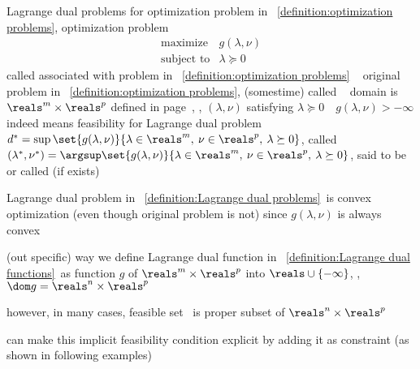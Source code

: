 \documentclass[17pt,landscape]{foils}
\begin{document}
{\begin{mydefinition}{Lagrange dual problems}
	for optimization problem in ~\ref{definition:optimization problems},
	optimization problem
	$$
		\begin{array}{ll}
			\mbox{maximize} &
				g(\lambda,\nu)
			\\
			\mbox{subject to} &
				\lambda \succeq 0
		\end{array}
	$$
	called 
	associated with problem in ~\ref{definition:optimization problems}
	\shrinkspacewithintheoremslike\
	\ibit
	\iitem
		original problem in ~\ref{definition:optimization problems},
		(somestime) called \define{primal problem}\
	\iitem
		domain is $\reals^m\times \reals^p$
	\iitem
		 defined in page~\pageref{page:dual feasible},
		\ie, $(\lambda,\nu)$ satisfying
		$
			\lambda \succeq 0 \quad g(\lambda,\nu) > -\infty
		$
		indeed means
		feasibility for Lagrange dual problem
	\iitem
		$d^\ast = \sup\set{g(\lambda,\nu)}{\lambda\in\reals^m,\:\nu\in\reals^p,\:\lambda\succeq 0}$,
		called 
	\iitem
		$(\lambda^\ast,\nu^\ast) = \argsup\set{g(\lambda,\nu)}{\lambda\in\reals^m,\:\nu\in\reals^p,\:\lambda\succeq 0}$,
		said to be  or called  (if exists)
	\eit
\end{mydefinition}
%

\bit
\item
	Lagrange dual problem in ~\ref{definition:Lagrange dual problems}\
	is convex optimization (even though original problem is not)
	since $g(\lambda,\nu)$ is always convex
\eit
\vfill



\bit
\item
	(out specific) way we define Lagrange dual function in ~\ref{definition:Lagrange dual functions}\
	as function $g$ of $\reals^m \times \reals^p$ into $\reals\cup\{-\infty\}$,
	\ie,
	$\dom g = \reals^n\times\reals^p$

\vitem
	however,
	in many cases,
	feasible set \
	is proper subset of $\reals^n\times\reals^p$

\vitem
	can make this implicit feasibility condition
	explicit by adding it as constraint
	(as shown in following examples)%
\eit


}
\end{document}

